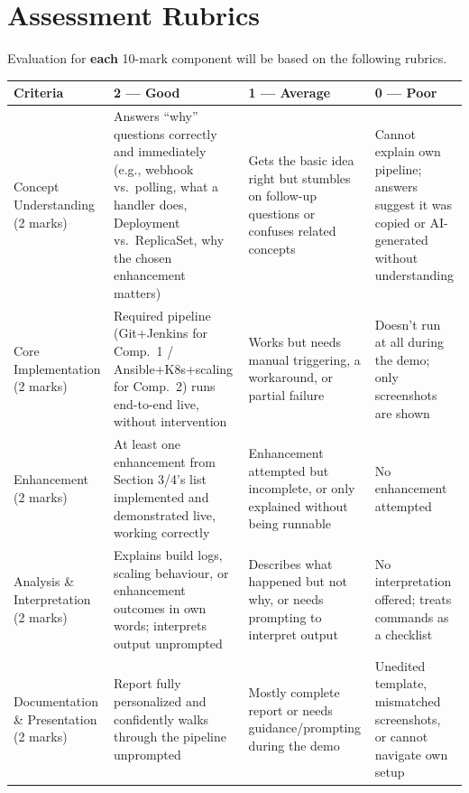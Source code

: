 \documentclass[12pt,a4paper]{article}
\newcommand{\sizeTwelve}{\fontsize{12pt}{14.5pt}\selectfont}  %
\begin{document}
\newpage

\section*{Assessment Rubrics}
{\sizeTwelve Evaluation for \textbf{each} 10-mark component will be based on the following rubrics.\par}

\vspace{0.4cm}

{\sizeTwelve
\setlength{\tabcolsep}{4pt}
\renewcommand{\arraystretch}{1.25}
\begin{longtable}{|>{\raggedright\arraybackslash}p{3.0cm}|>{\raggedright\arraybackslash}p{3.25cm}|>{\raggedright\arraybackslash}p{3.25cm}|>{\raggedright\arraybackslash}p{3.25cm}|}
\hline

\textbf{Criteria} & \textbf{2 --- Good} & \textbf{1 --- Average} & \textbf{0 --- Poor} \\

\hline
\endhead
Concept Understanding (2 marks) & Answers ``why'' questions correctly and immediately (e.g., webhook vs.\ polling, what a handler does, Deployment vs.\ ReplicaSet, why the chosen enhancement matters) & Gets the basic idea right but stumbles on follow-up questions or confuses related concepts & Cannot explain own pipeline; answers suggest it was copied or AI-generated without understanding \\
\hline
Core Implementation (2 marks) & Required pipeline (Git+Jenkins for Comp.\ 1 / Ansible+K8s+scaling for Comp.\ 2) runs end-to-end live, without intervention & Works but needs manual triggering, a workaround, or partial failure & Doesn't run at all during the demo; only screenshots are shown \\
\hline
Enhancement (2 marks) & At least one enhancement from Section 3/4's list implemented and demonstrated live, working correctly & Enhancement attempted but incomplete, or only explained without being runnable & No enhancement attempted \\
\hline
Analysis \& Interpretation (2 marks) & Explains build logs, scaling behaviour, or enhancement outcomes in own words; interprets output unprompted & Describes what happened but not why, or needs prompting to interpret output & No interpretation offered; treats commands as a checklist \\
\hline
Documentation \& Presentation (2 marks) & Report fully personalized  and confidently walks through the pipeline unprompted & Mostly complete report or needs guidance/prompting during the demo & Unedited template, mismatched screenshots, or cannot navigate own setup \\
\hline
\end{longtable}
\par}
\end{document}
